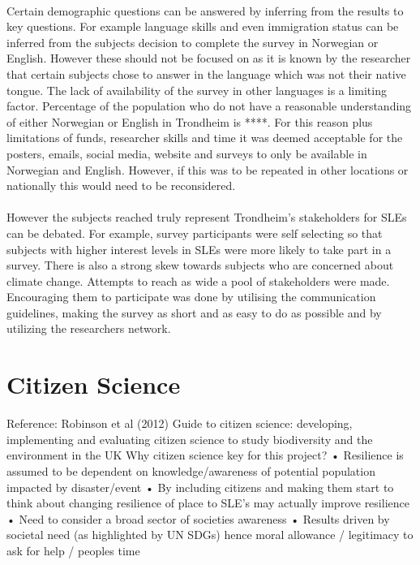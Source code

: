 \paragraph{}
Certain demographic questions can be answered by inferring from the results to key questions. For example language skills and even immigration status can be inferred from the subjects decision to complete the survey in Norwegian or English. However these should not be focused on as it is known by the researcher that certain subjects chose to answer in the language which was not their native tongue. The lack of availability of the survey in other languages is a limiting factor. Percentage of the population who do not have a reasonable understanding of either Norwegian or English in Trondheim is ****. For this reason plus limitations of funds, researcher skills and time it was deemed acceptable for the posters, emails, social media, website and surveys to only be available in Norwegian and English. However, if this was to be repeated in other locations or nationally this would need to be reconsidered. 
\paragraph{}
 However the subjects reached truly represent Trondheim's stakeholders for SLEs can be debated. For example, survey participants were self selecting so that subjects with higher interest levels in SLEs were more likely to take part in a survey. There is also a strong skew towards subjects who are concerned about climate change. Attempts to reach as wide a pool of stakeholders were made. Encouraging them to participate was done by utilising the communication guidelines, making the survey as short and as easy to do as possible and by utilizing the researchers network. 

\section{Citizen Science}
Reference: Robinson et al (2012) Guide to citizen science: developing, implementing and evaluating citizen science to study biodiversity and the environment in the UK 
Why citizen science key for this project?
•	Resilience is assumed to be dependent on knowledge/awareness of potential population impacted by disaster/event
•	By including citizens and making them start to think about changing resilience of place to SLE’s may actually improve resilience
•	Need to consider a broad sector of societies awareness
•	Results driven by societal need (as highlighted by UN SDGs) hence moral allowance / legitimacy to ask for help / peoples time

